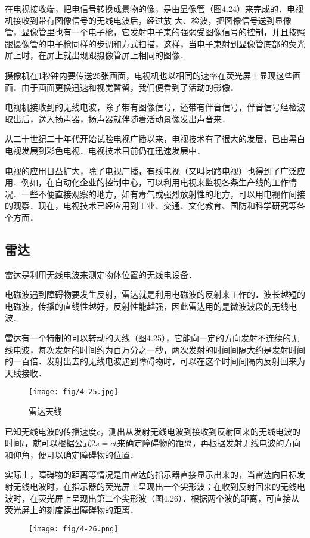 在电视接收端，把电信号转换成景物的像，是由显像管（图4.24）来完成的．电视机接收到带有图像信号的无线电波后，经过放
大、检波，把图像信号送到显像管，显像管里也有一个电子枪，它发射电子束的强弱受图像信号的控制，并且按照跟摄像管的电子枪同样的步调和方式扫描，这样，当电子束射到显像管底部的荧光屏上时，在屏上就出现跟摄像管屏上相同的图像．

摄像机在1秒钟内要传送25张画面，电视机也以相同的速率在荧光屏上显现这些画面．由于画面更换迅速和视觉暂留，我们便看到了活动的影像．

电视机接收到的无线电波，除了带有图像信号，还带有伴音信号，伴音信号经检波取出后，送入扬声器，扬声器就伴随着活动景像发出声音来．

从二十世纪二十年代开始试验电视广播以来，电视技术有了很大的发展，已由黑白电视发展到彩色电视．电视技术目前仍在迅速发展中．

电视的应用日益扩大，除了电视广播，有线电视（又叫闭路电视）也得到了广泛应用．例如，在自动化企业的控制中心，可以利用电视来监视各条生产线的工作情况．一些不便直接观察的地方，如有毒气或强烈放射性的地方，可以用电视作间接的观察．现在，电视技术已经应用到工业、交通、文化教育、国防和科学研究等各个方面．

\subsection{雷达}

雷达是利用无线电波来测定物体位置的无线电设备．

电磁波遇到障碍物要发生反射，雷达就是利用电磁波的反射来工作的．波长越短的电磁波，传播的直线性越好，反射性能越强，因此雷达用的是微波波段的无线电波．

雷达有一个特制的可以转动的天线（图4.25），它能向一定的方向发射不连续的无线电波，每次发射的时间约为百万分之一秒，两次发射的时间间隔大约是发射时间的一百倍．发射出去的无线电波遇到障碍物时，可以在这个时间间隔内反射回来为天线接收．
\begin{figure}[htp]\centering
	\texttt{[image: fig/4-25.jpg]}
	\caption{雷达天线}
	\end{figure}

已知无线电波的传播速度$c$，测出从发射无线电波到接收到反射回来的无线电波的时间$t$，就可以根据公式$2s=ct$来确定障碍物的距离，再根据发射无线电波的方向和仰角，便可以确定障碍物的位置．

实际上，障碍物的距离等情况是由雷达的指示器直接显示出来的，当雷达向目标发射无线电波时，在指示器的荧光屏上呈现出一个尖形波；在收到反射回来的无线电波时，在荧光屏上呈现出第二个尖形波（图4.26）．根据两个波的距离，可直接从荧光屏上的刻度读出障碍物的距离．
\begin{figure}[htp]\centering
	\texttt{[image: fig/4-26.png]}
	\caption{}
	\end{figure}

